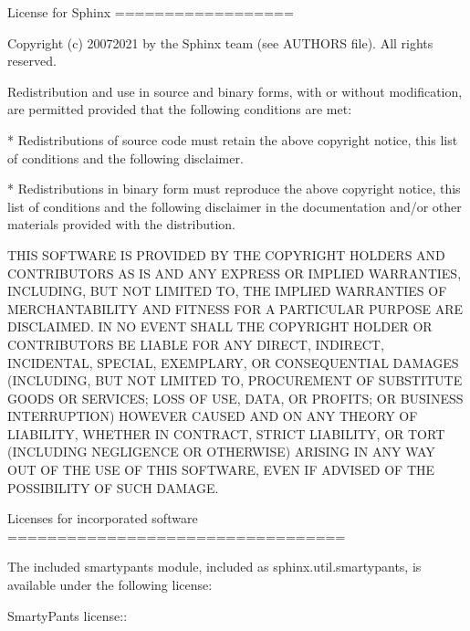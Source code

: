 \documentclass[letterpaper,10pt,english]{sphinxmanual}
\begin{document}
\begin{sphinxVerbatim}[commandchars=\\\{\}]
License for Sphinx
==================

Copyright (c) 2007\PYGZhy{}2021 by the Sphinx team (see AUTHORS file).
All rights reserved.

Redistribution and use in source and binary forms, with or without
modification, are permitted provided that the following conditions are
met:

* Redistributions of source code must retain the above copyright
  notice, this list of conditions and the following disclaimer.

* Redistributions in binary form must reproduce the above copyright
  notice, this list of conditions and the following disclaimer in the
  documentation and/or other materials provided with the distribution.

THIS SOFTWARE IS PROVIDED BY THE COPYRIGHT HOLDERS AND CONTRIBUTORS
\PYGZdq{}AS IS\PYGZdq{} AND ANY EXPRESS OR IMPLIED WARRANTIES, INCLUDING, BUT NOT
LIMITED TO, THE IMPLIED WARRANTIES OF MERCHANTABILITY AND FITNESS FOR
A PARTICULAR PURPOSE ARE DISCLAIMED. IN NO EVENT SHALL THE COPYRIGHT
HOLDER OR CONTRIBUTORS BE LIABLE FOR ANY DIRECT, INDIRECT, INCIDENTAL,
SPECIAL, EXEMPLARY, OR CONSEQUENTIAL DAMAGES (INCLUDING, BUT NOT
LIMITED TO, PROCUREMENT OF SUBSTITUTE GOODS OR SERVICES; LOSS OF USE,
DATA, OR PROFITS; OR BUSINESS INTERRUPTION) HOWEVER CAUSED AND ON ANY
THEORY OF LIABILITY, WHETHER IN CONTRACT, STRICT LIABILITY, OR TORT
(INCLUDING NEGLIGENCE OR OTHERWISE) ARISING IN ANY WAY OUT OF THE USE
OF THIS SOFTWARE, EVEN IF ADVISED OF THE POSSIBILITY OF SUCH DAMAGE.


Licenses for incorporated software
==================================

The included smartypants module, included as sphinx.util.smartypants,
is available under the following license:

\PYGZhy{}\PYGZhy{}\PYGZhy{}\PYGZhy{}\PYGZhy{}\PYGZhy{}\PYGZhy{}\PYGZhy{}\PYGZhy{}\PYGZhy{}\PYGZhy{}\PYGZhy{}\PYGZhy{}\PYGZhy{}\PYGZhy{}\PYGZhy{}\PYGZhy{}\PYGZhy{}\PYGZhy{}\PYGZhy{}\PYGZhy{}\PYGZhy{}\PYGZhy{}\PYGZhy{}\PYGZhy{}\PYGZhy{}\PYGZhy{}\PYGZhy{}\PYGZhy{}\PYGZhy{}\PYGZhy{}\PYGZhy{}\PYGZhy{}\PYGZhy{}\PYGZhy{}\PYGZhy{}\PYGZhy{}\PYGZhy{}\PYGZhy{}\PYGZhy{}\PYGZhy{}\PYGZhy{}\PYGZhy{}\PYGZhy{}\PYGZhy{}\PYGZhy{}\PYGZhy{}\PYGZhy{}\PYGZhy{}\PYGZhy{}\PYGZhy{}\PYGZhy{}\PYGZhy{}\PYGZhy{}\PYGZhy{}\PYGZhy{}\PYGZhy{}\PYGZhy{}\PYGZhy{}\PYGZhy{}\PYGZhy{}\PYGZhy{}\PYGZhy{}\PYGZhy{}\PYGZhy{}\PYGZhy{}\PYGZhy{}\PYGZhy{}\PYGZhy{}\PYGZhy{}
SmartyPants\PYGZus{} license::


\end{sphinxVerbatim}
\end{document}

